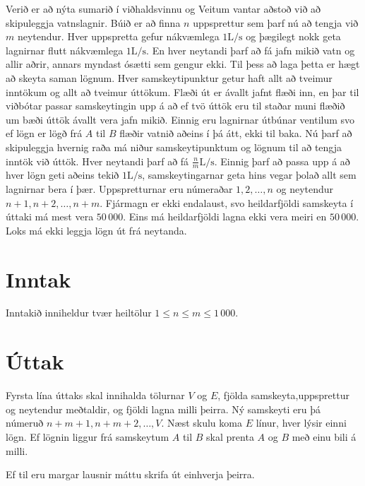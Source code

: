 
Verið er að nýta sumarið í viðhaldsvinnu og Veitum vantar aðstoð við að skipuleggja vatnslagnir.
Búið er að finna $n$ uppsprettur sem þarf nú að tengja við $m$ neytendur.
Hver uppspretta gefur nákvæmlega $1 \mathrm{L/s}$ og þægilegt nokk geta lagnirnar flutt nákvæmlega $1 \mathrm{L/s}$.
En hver neytandi þarf að fá jafn mikið vatn og allir aðrir, annars myndast ósætti sem gengur ekki.
Til þess að laga þetta er hægt að skeyta saman lögnum.
Hver samskeytipunktur getur haft allt að tveimur inntökum og allt að tveimur úttökum.
Flæði út er ávallt jafnt flæði inn,
en þar til viðbótar passar samskeytingin upp á að ef tvö úttök eru til staðar muni flæðið um bæði úttök ávallt vera jafn mikið.
Einnig eru lagnirnar útbúnar ventilum svo ef lögn er lögð frá $A$ til $B$ flæðir vatnið aðeins í þá átt, ekki til baka.
Nú þarf að skipuleggja hvernig raða má niður samskeytipunktum og lögnum til að tengja inntök við úttök.
Hver neytandi þarf að fá $\frac{n}{m} \mathrm{L/s}$.
Einnig þarf að passa upp á að hver lögn geti aðeins tekið $1 \mathrm{L/s}$, samskeytingarnar geta hins vegar þolað allt sem lagnirnar bera í þær.
Uppspretturnar eru númeraðar $1, 2, \dots, n$ og neytendur $n + 1, n + 2, \dots, n + m$.
Fjármagn er ekki endalaust, svo heildarfjöldi samskeyta í úttaki má mest vera $50\,000$.
Eins má heildarfjöldi lagna ekki vera meiri en $50\,000$.
Loks má ekki leggja lögn út frá neytanda.

\section*{Inntak}
Inntakið inniheldur tvær heiltölur $1 \leq n \leq m \leq 1\,000$.

\section*{Úttak}
Fyrsta lína úttaks skal innihalda tölurnar $V$ og $E$, fjölda samskeyta,uppsprettur og neytendur meðtaldir, og fjöldi lagna milli þeirra.
Ný samskeyti eru þá númeruð $n + m + 1, n + m + 2, \dots, V$.
Næst skulu koma $E$ línur, hver lýsir einni lögn.
Ef lögnin liggur frá samskeytum $A$ til $B$ skal prenta $A$ og $B$ með einu bili á milli.

Ef til eru margar lausnir máttu skrifa út einhverja þeirra.
